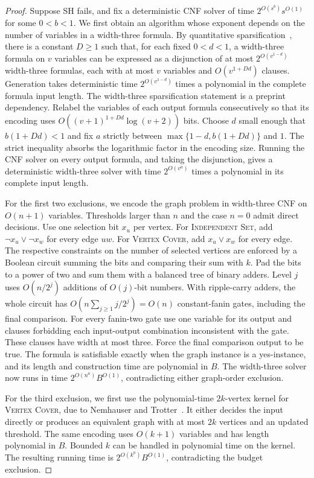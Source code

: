 \documentclass[11pt]{article}
\begin{document}
\begin{proof}
Suppose SH fails, and fix a deterministic CNF solver of time
\(2^{O(s^b)}s^{O(1)}\) for some \(0<b<1\).
We first obtain an algorithm whose exponent depends on the number of
variables in a width-three formula. By quantitative
sparsification~\cite[Lemma~2.2]{sh}, there is a constant \(D\ge1\) such
that, for each fixed \(0<d<1\), a width-three formula on \(v\) variables
can be expressed as a disjunction of at most \(2^{O(v^{1-d})}\)
width-three formulas, each with at most \(v\) variables and
\(O(v^{1+Dd})\) clauses. Generation takes deterministic time
\(2^{O(v^{1-d})}\) times a polynomial in the complete formula input
length. The width-three sparsification statement is a preprint dependency.
Relabel the variables of each output formula consecutively so that its
encoding uses \(O((v+1)^{1+Dd}\log(v+2))\) bits.
Choose \(d\) small enough that \(b(1+Dd)<1\) and fix \(a\) strictly between
\(\max\{1-d,b(1+Dd)\}\) and \(1\). The strict inequality absorbs the
logarithmic factor in the encoding size. Running the CNF solver on
every output formula, and taking the disjunction, gives a deterministic
width-three solver with time \(2^{O(v^a)}\) times a polynomial in its
complete input length.

For the first two exclusions, we encode the graph problem in width-three
CNF on \(O(n+1)\) variables. Thresholds larger than \(n\) and the case
\(n=0\) admit direct decisions. Use one selection bit \(x_u\) per vertex.
For \textsc{Independent Set}, add
\(\neg x_u\lor \neg x_w\) for every edge \(uw\).
For \textsc{Vertex Cover}, add \(x_u\lor x_w\) for every edge.
The respective constraints on the number of selected vertices are
enforced by a Boolean circuit summing the bits and comparing their sum
with \(k\). Pad the bits to a power of two and sum them with a balanced
tree of binary adders. Level \(j\) uses \(O(n/2^j)\) additions of
\(O(j)\)-bit numbers. With ripple-carry adders, the whole circuit has
\(O(n\sum_{j\ge1}j/2^j)=O(n)\) constant-fanin gates, including the
final comparison. For every fanin-two gate use one variable for its
output and clauses forbidding each input-output combination inconsistent
with the gate. These clauses have width at most three. Force the final
comparison output to be true. The formula is satisfiable exactly when
the graph instance is a yes-instance, and its length and construction
time are polynomial in \(B\). The width-three solver now runs in time
\(2^{O(n^a)}B^{O(1)}\), contradicting either graph-order exclusion.

For the third exclusion, we first use the polynomial-time
\(2k\)-vertex kernel for \textsc{Vertex Cover}, due to Nemhauser and
Trotter~\cite{nt,jb}. It either decides the input directly or produces an
equivalent graph with at most \(2k\) vertices and an updated threshold.
The same encoding uses \(O(k+1)\) variables and has length polynomial in
\(B\). Bounded \(k\) can be handled in polynomial time on the kernel.
The resulting running time is \(2^{O(k^a)}B^{O(1)}\), contradicting
the budget exclusion.
\end{proof}
\end{document}
